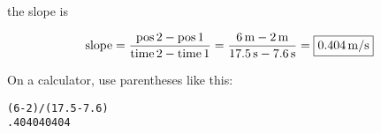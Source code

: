 \documentclass[answers]{exam}
\begin{document}
\begin{questions}
\begin{parts}
\begin{solution}
    the slope is

    \begin{equation*}
        \text{slope} = \frac{\text{pos\,2} - \text{pos\,1}}{\text{time\,2} - \text{time\,1}} 
        = \frac{\SI{6}{m} - \SI{2}{m}}{\SI{17.5}{s} - \SI{7.6}{s}} = \boxed{\SI{0.404}{m/s}}
    \end{equation*}

    \bigskip

    On a calculator, use parentheses like this:

    \medskip

    \begin{center}
        \texttt{(6-2)/(17.5-7.6)}\\
        \hspace{2.5em} \texttt{.404040404}
    \end{center}
\end{solution}

\end{parts}



\end{questions}
\end{document}
